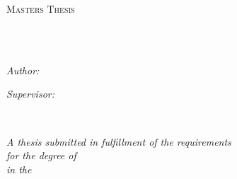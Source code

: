 \documentclass[
11pt, %
english, %
singlespacing, %
headsepline, %
]{MastersDoctoralThesis} %
\author{Martijn \textsc{Vermeulen}} %
\begin{document}
\frontmatter %

\pagestyle{plain} %


\begin{titlepage}
\begin{center}

\vspace*{.06\textheight}
{\scshape\LARGE \univname\par}\vspace{1.5cm} %
\textsc{\Large Masters Thesis}\\[0.5cm] %

\HRule \\[0.4cm] %
{\huge \bfseries \ttitle\par}\vspace{0.4cm} %
\HRule \\[1.5cm] %
 
\begin{minipage}[t]{0.4\textwidth}
\begin{flushleft} \large
\emph{Author:}\\
\href{https://www.vermeulen.tech}{\authorname} %
\end{flushleft}
\end{minipage}
\begin{minipage}[t]{0.4\textwidth}
\begin{flushright} \large
\emph{Supervisor:} \\
\href{http://asterios.katsifodimos.com/}{\supname} %
\end{flushright}
\end{minipage}\\[3cm]
 
\vfill

\large \textit{A thesis submitted in fulfillment of the requirements\\ for the degree of \degreename}\\[0.3cm] %
\textit{in the}\\[0.4cm]
\groupname\\\deptname\\[2cm] %



\end{center}
\end{titlepage}
\end{document}
